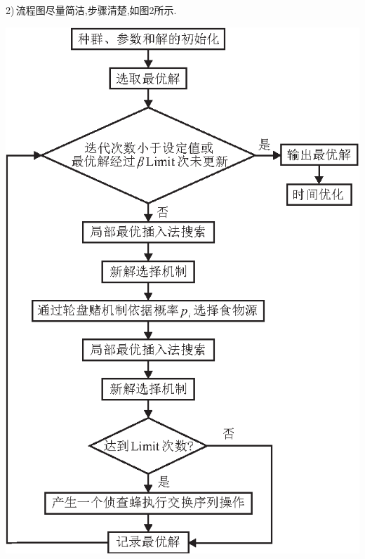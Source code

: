 \documentclass{ctacn}%
\begin{document}
\begin{multicols}{2}
2)\,流程图尽量简洁,步骤清楚,如图2所示.\vspace{10pt}
\begin{center}
	\includegraphics[scale=1,trim=0 0 0 0]{template-2}\\
	\label{Fig1}
\end{center}


\end{multicols}
\end{document}
